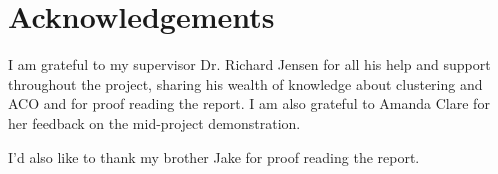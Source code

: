\thispagestyle{empty}


\section*{\centering Acknowledgements}


I am grateful to my supervisor Dr. Richard Jensen for all his help and support throughout the project, sharing his wealth of knowledge about clustering and ACO and for proof reading the report. I am also grateful to Amanda Clare for her feedback on the mid-project demonstration. 

I'd also like to thank my brother Jake for proof reading the report.

